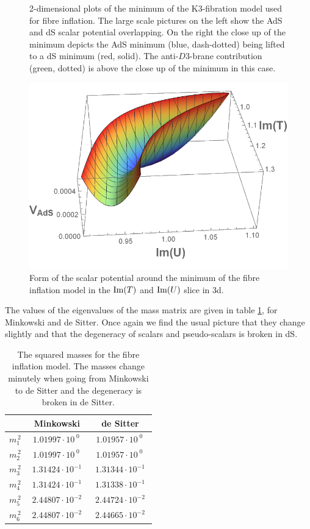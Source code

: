 \documentclass[12pt]{report}
\def\rmim{{\rm Im}}
\begin{document}
\begin{figure}[htb]
\caption{2-dimensional plots of the minimum of the K3-fibration model used for fibre inflation. The large scale pictures on the left show the AdS and dS scalar potential overlapping. On the right the close up of the minimum depicts the AdS minimum (blue, dash-dotted) being lifted to a dS minimum (red, solid). The anti-$D3$-brane contribution (green, dotted) is above the close up of the minimum in this case. }
\label{fig:fibre2d}
\end{figure}
\begin{figure}[htb]
\centering
\includegraphics[scale=0.7]{fibre3DLarge}
\caption{Form of the scalar potential around the minimum of the fibre inflation model in the $\rmim(T)$ and $\rmim(U)$ slice in 3d.}
\label{fig:fibre3d}
\end{figure}

The values of the eigenvalues of the mass matrix are given in table \ref{tab:fibremass}, for Minkowski and de Sitter. Once again we find the usual picture that they change slightly and that the degeneracy of scalars and pseudo-scalars is broken in dS.
\begin{table}[htb]
\centering
\begin{tabular}{|c|c|c|}\hline
&  Minkowski  & de Sitter \\\hline
$m_1^{\,2}$ & $\; 1.01997 \cdot 10^{\;0} \,\;$ & $\; 1.01957 \cdot 10^{\;0} \,\;$\\\hline
$m_2^{\,2}$ & $\; 1.01997 \cdot 10^{\;0} \,\;$ & $\; 1.01957\cdot 10^{\;0}  \,\;$\\\hline
$m_3^{\,2}$ & $\; 1.31424 \cdot 10^{-1} \;$ & $\; 1.31344 \cdot 10^{-1} \;$\\\hline
$m_4^{\,2}$ & $\; 1.31424 \cdot 10^{-1} \;$ & $\; 1.31338 \cdot 10^{-1} \;$\\\hline
$m_5^{\,2}$ & $\; 2.44807 \cdot 10^{-2} \;$ & $\; 2.44724 \cdot 10^{-2} \;$\\\hline
$m_6^{\,2}$ & $\; 2.44807 \cdot 10^{-2} \;$ & $\; 2.44665 \cdot 10^{-2} \;$\\\hline
\end{tabular}
\caption{The squared masses for the fibre inflation model. The masses change minutely when going from Minkowski to de Sitter and the degeneracy is broken in de Sitter.}
\label{tab:fibremass}
\end{table}
\end{document}
